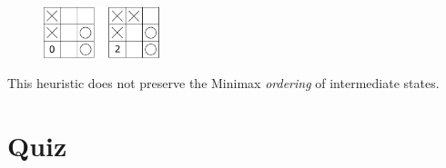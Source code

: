 \documentclass[11pt, a4paper]{article}
\begin{document}
\begin{enumerate}
\begin{solution}
        \begin{figure}[h]
            \centering
            \includegraphics[width=0.3\textwidth]{figures/e2_misleading.pdf}
        \end{figure}

        This heuristic does not preserve the Minimax \emph{ordering} of intermediate states.
    \end{solution}

\end{enumerate}

\newpage

\section{Quiz}
\end{document}
